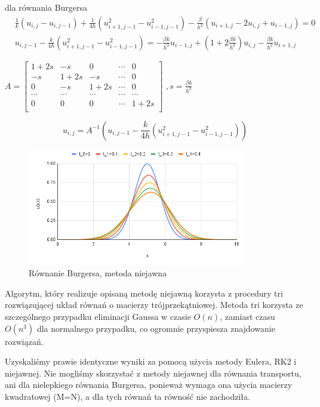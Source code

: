 \documentclass[12pt, a4paper]{article}
\begin{document}
dla równania Burgersa
\begin{equation}
\begin{split}
& \frac{1}{k}(u_{i,j}-u_{i,j-1})+\frac{1}{4h}(u_{i+1,j-1}^{2}-u_{i-1,j-1}^{2})-\frac{\beta}{h^{2}}(u_{i+1,j}-2u_{i,j}+u_{i-1,j})=0\\
& u_{i,j-1}-\frac{k}{4h}(u_{i+1,j-1}^{2}-u_{i-1,j-1}^{2})=-\frac{\beta k}{h^{2}}u_{i-1,j}+(1+2\frac{\beta k}{h^{2}})u_{i,j}-\frac{\beta k}{h^{2}}u_{i+1,j}
\end{split}
\end{equation}
\begin{center}
$A=
\begin{bmatrix}
1+2s & -s & 0 & \cdots & 0\\
-s & 1+2s & -s & \cdots & 0\\
0 & -s & 1+2s & \cdots & 0\\
\cdots & \cdots & \cdots & \cdots & \cdots\\
0 & 0 & 0 & \cdots & 1+2s\\
\end{bmatrix}$
$,s=\frac{\beta k}{h^{2}}$
\end{center}
\begin{equation}
u_{i,j}=A^{-1}(u_{i,j-1}-\frac{k}{4h}(u_{i+1,j-1}^{2}-u_{i-1,j-1}^{2}))
\end{equation}
\begin{figure}[h]
\caption{Równanie Burgersa, metoda niejawna}
\centering
\includegraphics[width=0.85\textwidth]{9}
\end{figure}
\newline
Algorytm, który realizuje opisaną metodę niejawną korzysta z procedury tri rozwiązującej układ równań o macierzy trójprzekątniowej. Metoda tri korzysta ze szczególnego przypadku eliminacji Gaussa w czasie $O(n)$, zamiast czasu $O(n^3)$ dla normalnego przypadku, co ogromnie przyspiesza znajdowanie rozwiązań.
\newpage

Uzyskaliśmy prawie identyczne wyniki za pomocą użycia metody Eulera, RK2 i niejawnej. Nie mogliśmy skorzystać z metody niejawnej dla równania transportu, ani dla nielepkiego równania Burgersa, ponieważ wymaga ona użycia macierzy kwadratowej (M=N), a dla tych równań ta równość nie zachodziła.\\
\end{document}
